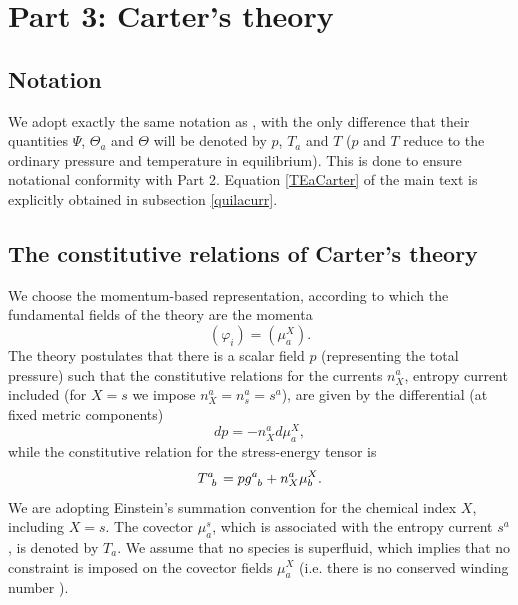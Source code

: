 \documentclass[a4paper, amsfonts, amssymb, amsmath, reprint, showkeys, nofootinbib, twoside, onecolumn,notitlepage]{revtex4-1}
\begin{document}
\newpage

\section*{Part 3: Carter's theory}


\subsection{Notation}

We adopt exactly the same notation as \citet{Carter_starting_point}, with the only difference that their quantities $\Psi$, $\Theta_a$ and $\Theta$ will be denoted by $p$, $T_a$ and $T$ ($p$ and $T$ reduce to the ordinary pressure and temperature in equilibrium). This is done to ensure notational conformity with Part 2. Equation \eqref{TEaCarter} of the main text is explicitly obtained in subsection \ref{quilacurr}.



\subsection{The constitutive relations of Carter's theory}

We choose the momentum-based representation, according to which the fundamental fields of the theory are the momenta
\begin{equation}
(\varphi_i) = (\mu^X_a).
\end{equation}
The theory postulates that there is a scalar field $p$ (representing the total pressure) such that the constitutive relations for the currents $n_X^a$, entropy current included (for $X=s$ we impose $n_X^a=n_s^a=s^a$), are given by the differential (at fixed metric components)
\begin{equation}\label{dpippo}
dp = -n_X^a d\mu^X_a,
\end{equation}
while the constitutive relation for the stress-energy tensor is
\begin{equation}\label{CarterStressenergy}
T\indices{^a _b} = p g\indices{^a _b} + n_X^a \mu^X_b.
\end{equation}
We are adopting Einstein's summation convention for the chemical index $X$, including $X=s$. The covector $\mu_a^s$, which is associated with the entropy current $s^a$, is denoted by $T_a$. We assume that no species is superfluid, which implies that no constraint is imposed on the covector fields $\mu_a^X$ (i.e. there is no conserved winding number \cite{Termo}).
\end{document}
